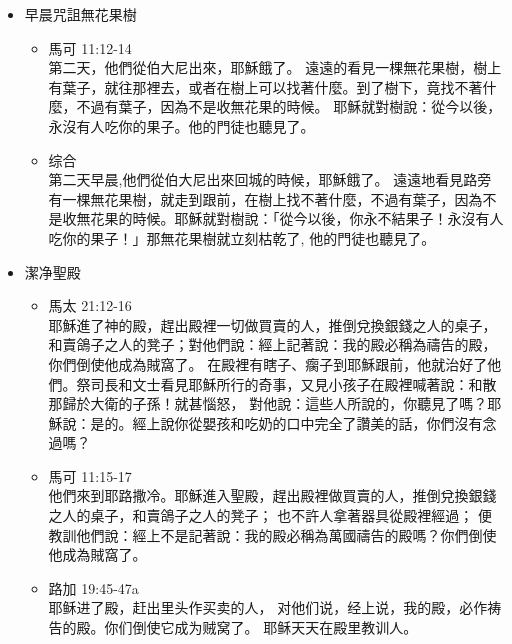 \begin{itemize}
\item 早晨咒詛無花果樹
\begin{itemize}
馬太 21:18-19\\
早晨回城的時候，他餓了，
看見路旁有一棵無花果樹，就走到跟前，在樹上找不著什麼，不過有葉子，就對樹說：從今以後，你永不結果子。那無花果樹就立刻枯乾了。
\item 馬可 11:12-14\\
第二天，他們從伯大尼出來，耶穌餓了。
遠遠的看見一棵無花果樹，樹上有葉子，就往那裡去，或者在樹上可以找著什麼。到了樹下，竟找不著什麼，不過有葉子，因為不是收無花果的時候。
耶穌就對樹說：從今以後，永沒有人吃你的果子。他的門徒也聽見了。
\item 综合\\
第二天早晨,他們從伯大尼出來回城的時候，耶穌餓了。 遠遠地看見路旁有一棵無花果樹，就走到跟前，在樹上找不著什麼，不過有葉子，因為不是收無花果的時候。耶穌就對樹說：「從今以後，你永不結果子！永沒有人吃你的果子！」那無花果樹就立刻枯乾了, 他的門徒也聽見了。
\end{itemize}
\item 潔净聖殿
\begin{itemize}
\item 馬太 21:12-16\\
耶穌進了神的殿，趕出殿裡一切做買賣的人，推倒兌換銀錢之人的桌子，和賣鴿子之人的凳子；對他們說：經上記著說：我的殿必稱為禱告的殿，你們倒使他成為賊窩了。
在殿裡有瞎子、瘸子到耶穌跟前，他就治好了他們。祭司長和文士看見耶穌所行的奇事，又見小孩子在殿裡喊著說：和散那歸於大衛的子孫！就甚惱怒，
對他說：這些人所說的，你聽見了嗎？耶穌說：是的。經上說你從嬰孩和吃奶的口中完全了讚美的話，你們沒有念過嗎？
\item 馬可 11:15-17\\
他們來到耶路撒冷。耶穌進入聖殿，趕出殿裡做買賣的人，推倒兌換銀錢之人的桌子，和賣鴿子之人的凳子；
也不許人拿著器具從殿裡經過；
便教訓他們說：經上不是記著說：我的殿必稱為萬國禱告的殿嗎？你們倒使他成為賊窩了。
\item 路加 19:45-47a\\
耶稣进了殿，赶出里头作买卖的人， 对他们说，经上说，我的殿，必作祷告的殿。你们倒使它成为贼窝了。 耶稣天天在殿里教训人。 

\end{itemize}
\end{itemize}

